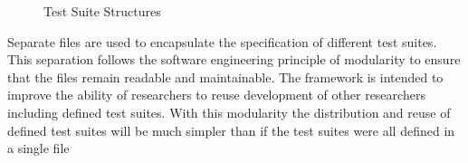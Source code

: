 \begin{figure}
{\begin{minipage}[c]{%
	   0.4\textwidth}
\end{minipage}
}
\caption{Test Suite Structures}
\end{figure}

Separate files are used to encapsulate the specification of different test suites.
This separation follows the software engineering principle of modularity to ensure that the files remain readable and maintainable.
The framework is intended to improve the ability of researchers to reuse development of other researchers including defined test suites.
With this modularity the distribution and reuse of defined test suites will be much simpler than if the test suites were all defined in a single file


% 

